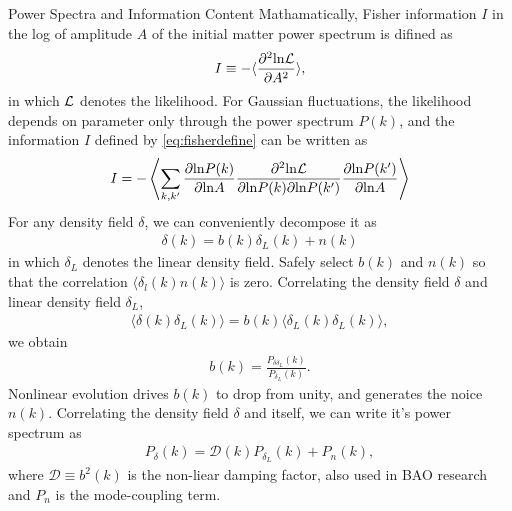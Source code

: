 \begin{section}{Power Spectra and Information Content}
%
    Mathamatically, Fisher information \cite{bib:Tegmark1997} $I$ in the log of amplitude $A$ of the initial 
matter power spectrum is difined as 
\begin{align}
   I \equiv - \langle \frac{\partial ^2 \mathrm{ln \mathcal{L}}}{\partial A ^2} \rangle,
\label{eq:fisherdefine}
\end{align}
   in which $\mathcal{L}$ denotes the likelihood. For Gaussian fluctuations, the likelihood depends on
parameter only through the power spectrum $P(k)$, and the information $I$ defined by \ref{eq:fisherdefine}
can be written as \cite{bib:Rimes2006}
\begin{align}
    I = - \left\langle \sum_{k,k'} \frac{\partial \mathrm{ln} P(k)}{\partial \mathrm{ln} A} 
\frac{\partial ^2 \mathrm{ln \mathcal{L}}}{\partial \mathrm{ln} P(k) \partial \mathrm{ln} P(k')}
\frac{\partial \mathrm{ln} P(k')}{\partial \mathrm{ln} A}\right\rangle
\label{eq:fisherdefineforgaussian}
\end{align}
    For any density field $\delta$, we can conveniently decompose it as
\begin{align}
    \delta (k) = b (k) \delta _L (k) + n (k)
\label{eq:decompose}
\end{align}
in which $\delta_L$ denotes the linear density field. Safely select $b (k)$ and $n (k)$ 
so that the correlation $\langle \delta_l (k) n (k) \rangle$ is zero. Correlating the density field 
$\delta$ and linear density field $\delta_L$,
\begin{align}
   \langle \delta (k) \delta_L (k) \rangle = b (k) \langle \delta_L (k) \delta_L (k) \rangle,
\label{eq:correlating}
\end{align} 
    we obtain
\begin{align}
    b (k) = \frac{P _{\delta \delta_L}(k)}{P_{\delta_L}(k)}.
\label{eq:bofk}
\end{align}
Nonlinear evolution drives $b (k)$ to drop from unity, and generates the noice $n (k)$. 
Correlating the density field $\delta$ and itself, we can write it's power spectrum as
\begin{align}
   P_\delta (k) = \mathcal{D} (k) P_{\delta_L} (k) + P_n (k),
\label{eq:powerdecompose}
\end{align}
where $\mathcal{D} \equiv b^2 (k)$ is the non-liear damping factor, also used in BAO research 
and $P_n$ is the mode-coupling term.


\end{section}

